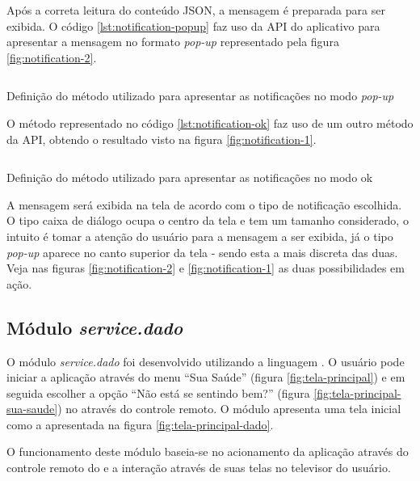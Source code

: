 Após a correta leitura do conteúdo JSON, a mensagem é preparada para ser 
exibida. O código \ref{lst:notification-popup} faz uso da API do aplicativo
\xbmc[] para apresentar a mensagem no formato \textit{pop-up} representado pela
figura \ref{fig:notification-2}.

\begin{listing}[ht!]
\inputminted{python}{codigos/notification-popup.py}
\caption{Definição do método utilizado para apresentar as notificações no modo
\textit{pop-up}}
\label{lst:notification-popup}
\end{listing}

O método representado no código \ref{lst:notification-ok} faz uso de um outro 
método da API, obtendo o resultado visto na figura \ref{fig:notification-1}.

\begin{listing}[ht!]
\inputminted{python}{codigos/notification-ok.py}
\caption{Definição do método utilizado para apresentar as notificações no modo
ok}
\label{lst:notification-ok}
\end{listing}

A mensagem será exibida na tela de acordo com o tipo de notificação escolhida. O
tipo caixa de diálogo ocupa o centro da tela e tem um tamanho considerado, o 
intuito é tomar a atenção do usuário para a mensagem a ser exibida, já o tipo
\textit{pop-up} aparece no canto superior da tela - sendo esta a mais discreta 
das duas. Veja nas figuras \ref{fig:notification-2} e \ref{fig:notification-1} 
as duas possibilidades em ação.


\subsection{Módulo \textit{service.dado}}\label{subsec:dado}

O módulo \textit{service.dado} foi desenvolvido utilizando a linguagem 
\python[]. O usuário pode iniciar a aplicação através do menu ``Sua Saúde''
(figura \ref{fig:tela-principal}) e em seguida escolher a opção ``Não está se 
sentindo bem?'' (figura \ref{fig:tela-principal-sua-saude}) no \stb[] através do 
controle remoto. O módulo apresenta uma tela inicial como a apresentada na 
figura \ref{fig:tela-principal-dado}.

O funcionamento deste módulo baseia-se no acionamento da aplicação através
do controle remoto do \stb[] e a interação através de suas telas no televisor
do usuário. 

